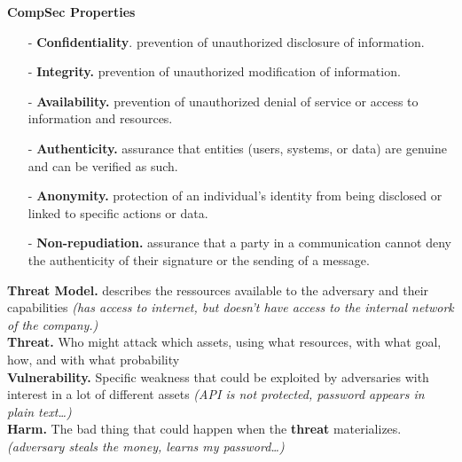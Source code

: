 \documentclass[8pt]{article}
\begin{document}
\vspace*{-20px}
\noindent
\begin{minipage}[t]{0.49\textwidth}
	\noindent\textbf{CompSec Properties}
	\begin{itemize}
		\item[-] \textbf{Confidentiality}. prevention of unauthorized disclosure of information.
		\item[-] \textbf{Integrity.} prevention of unauthorized modification of information.
		\item[-] \textbf{Availability.} prevention of unauthorized denial of service or access to information and resources.
		\item[-] \textbf{Authenticity.} assurance that entities (users, systems, or data) are genuine and can be verified as such.
		\item[-] \textbf{Anonymity.} protection of an individual's identity from being disclosed or linked to specific actions or data.
		\item[-] \textbf{Non-repudiation.} assurance that a party in a communication cannot deny the authenticity of their signature or the sending of a message.
	\end{itemize}

	\noindent \textbf{Threat Model.} describes the ressources available to the adversary and their capabilities \textit{(has access to internet, but doesn't have access to the internal network of the company.)}\\
	\noindent \textbf{Threat.} Who might attack which assets, using what resources, with what goal, how, and with what probability\\
	\noindent \textbf{Vulnerability.} Specific weakness that could be exploited by adversaries with interest in a lot of different assets \textit{(API is not protected, password appears in plain text\dots)}\\
	\noindent \textbf{Harm.} The bad thing that could happen when the \textbf{threat} materializes. \textit{(adversary steals the money, learns my password\dots)}
\end{minipage}
\hfill
\noindent
\end{document}

